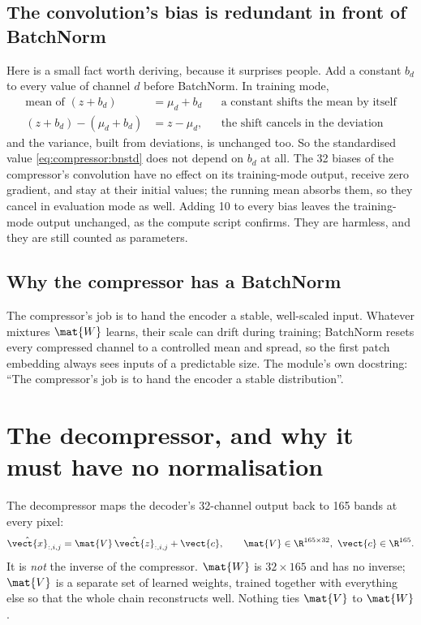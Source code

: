 \subsection{The convolution's bias is redundant in front of BatchNorm}

Here is a small fact worth deriving, because it surprises people. Add a constant $b_d$ to every value of
channel $d$ before BatchNorm. In training mode,
\begin{align*}
\text{mean of } (z + b_d) &= \mu_d + b_d
  && \text{a constant shifts the mean by itself}\\
(z + b_d) - (\mu_d + b_d) &= z - \mu_d,
  && \text{the shift cancels in the deviation}
\end{align*}
and the variance, built from deviations, is unchanged too. So the standardised value
\cref{eq:compressor:bnstd} does not depend on $b_d$ at all. The 32 biases of the compressor's
convolution have no effect on its training-mode output, receive zero gradient, and stay at their initial
values; the running mean absorbs them, so they cancel in evaluation mode as well. Adding 10 to every bias
leaves the training-mode output unchanged, as the compute script confirms\tagC. They are
harmless, and they are still counted as parameters.

\subsection{Why the compressor has a BatchNorm}

The compressor's job is to hand the encoder a stable, well-scaled input. Whatever mixtures $\mat{W}$
learns, their scale can drift during training; BatchNorm resets every compressed channel to a controlled
mean and spread, so the first patch embedding always sees inputs of a predictable size. The module's own
docstring: ``The compressor's job is to hand the encoder a stable distribution''.

\section{The decompressor, and why it must have no normalisation}\label{sec:compressor:decomp}

The decompressor maps the decoder's 32-channel output back to 165 bands at every pixel:
\begin{equation}\label{eq:compressor:decomp}
\hat{\vect{x}}_{:,i,j} = \mat{V}\,\hat{\vect{z}}_{:,i,j} + \vect{c},\qquad
\mat{V}\in\R^{165\times32},\ \vect{c}\in\R^{165}.
\end{equation}
It is \emph{not} the inverse of the compressor. $\mat{W}$ is $32\times165$ and has no inverse; $\mat{V}$
is a separate set of learned weights, trained together with everything else so that the whole chain
reconstructs well. Nothing ties $\mat{V}$ to $\mat{W}$.


